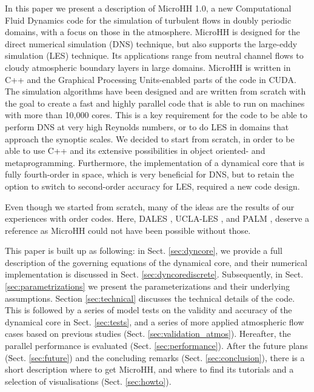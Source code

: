 \documentclass[gmd,manuscript]{copernicus}
\begin{document}
\introduction  %
In this paper we present a description of MicroHH 1.0, a new Computational Fluid Dynamics code for the simulation of turbulent flows in doubly periodic domains, with a focus on those in the atmosphere. MicroHH is designed for the direct numerical simulation (DNS) technique, but also supports the large-eddy simulation (LES) technique. Its applications range from neutral channel flows to cloudy atmospheric boundary layers in large domains. MicroHH is written in C++ and the Graphical Processing Units-enabled parts of the code in CUDA. The simulation algorithms have been designed and are written from scratch with the goal to create a fast and highly parallel code that is able to run on machines with more than 10,000 cores. This is a key requirement for the code to be able to perform DNS at very high Reynolds numbers, or to do LES in domains that approach the synoptic scales. We decided to start from scratch, in order to be able to use C++ and its extensive possibilities in object oriented- and metaprogramming. Furthermore, the implementation of a dynamical core that is fully fourth-order in space, which is very beneficial for DNS, but to retain the option to switch to second-order accuracy for LES, required a new code design.

Even though we started from scratch, many of the ideas are the results of our experiences with order codes. Here, DALES \citep{Heus2010}, UCLA-LES \citep{Stevens2005}, and PALM \citep{Maronga2015}, deserve a reference as MicroHH could not have been possible without those.

This paper is built up as following: in Sect. \ref{sec:dyncore}, we provide a full description of the governing equations of the dynamical core, and their numerical implementation is discussed in Sect. \ref{sec:dyncorediscrete}. Subsequently, in Sect. \ref{sec:parametrizations} we present the parameterizations and their underlying assumptions. Section \ref{sec:technical} discusses the technical details of the code. This is followed by a series of model tests on the validity and accuracy of the dynamical core in Sect. \ref{sec:tests}, and a series of more applied atmospheric flow cases based on previous studies (Sect. \ref{sec:validation_atmos}). Hereafter, the parallel performance is evaluated (Sect. \ref{sec:performance}). After the  future plans (Sect. \ref{sec:future}) and the concluding remarks (Sect. \ref{sec:conclusion}), there is a short description where to get MicroHH, and where to find its tutorials and a selection of visualisations (Sect. \ref{sec:howto}).
\end{document}
